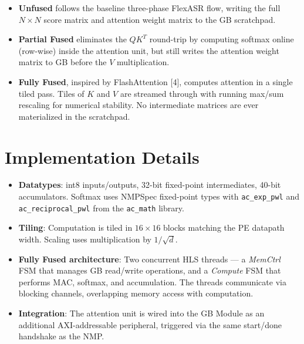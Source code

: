 \documentclass{article}
\begin{document}
\begin{itemize}
\item \textbf{Unfused} follows the baseline three-phase FlexASR flow, writing the full $N \times N$ score matrix and attention weight matrix to the GB scratchpad.

\item \textbf{Partial Fused} eliminates the $QK^T$ round-trip by computing softmax online (row-wise) inside the attention unit, but still writes the attention weight matrix to GB before the $V$ multiplication.

\item \textbf{Fully Fused}, inspired by FlashAttention [4], computes attention in a single tiled pass. Tiles of $K$ and $V$ are streamed through with running max/sum rescaling for numerical stability. No intermediate matrices are ever materialized in the scratchpad.
\end{itemize}



\section*{Implementation Details}

\begin{itemize}
\item \textbf{Datatypes}: int8 inputs/outputs, 32-bit fixed-point intermediates, 40-bit accumulators. Softmax uses NMPSpec fixed-point types with \texttt{ac\_exp\_pwl} and \texttt{ac\_reciprocal\_pwl} from the \texttt{ac\_math} library.

\item \textbf{Tiling}: Computation is tiled in $16 \times 16$ blocks matching the PE datapath width. Scaling uses multiplication by $1/\sqrt{d}$.

\item \textbf{Fully Fused architecture}: Two concurrent HLS threads --- a \textit{MemCtrl} FSM that manages GB read/write operations, and a \textit{Compute} FSM that performs MAC, softmax, and accumulation. The threads communicate via blocking channels, overlapping memory access with computation.

\item \textbf{Integration}: The attention unit is wired into the GB Module as an additional AXI-addressable peripheral, triggered via the same start/done handshake as the NMP.
\end{itemize}
\end{document}
